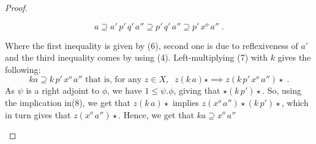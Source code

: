 \documentclass[a4paper]{article}
\theoremstyle{definition}
\begin{document}
\begin{proof}
\begin{enumerate}[label=(\roman*)]
					\begin{equation}
						a\supseteq a'\,p'\,q'\,a'' \supseteq p'\,q'\,a''
						\supseteq p' \,x^o \,a'' \; .
					\end{equation}

					Where the first inequality is given by (6), second one
					is due to reflexiveness	of $a'$ and the third inequality comes by using (4).
					Left-multiplying (7) with $k$ gives the following:
					\begin{equation}
						ka \supseteq k\,p'\,x^o\,a'' \text{ that is, for any } z\in X,
						\; \; z (k\, a) \star \implies z ( k\,p'\,x^o\,a'') \star \; .
					\end{equation}
					As $\psi$ is a right adjoint to $\phi$, we have $1\leq \psi.\phi$, giving that
					$\star (k \, p' )\star $. So, using the implication in(8), we get that
					$z(k\, a) \star $ implies $z ( x^o\,a'') \star (k\,p') \star$, which in turn
					gives that $z(x^o \, a'')\star$. Hence, we get that $ka \supseteq x^o\, a''$
					\qedhere
			\end{enumerate}
		\end{proof}
\newpage
\nocite{Leinster_2014}
		\printbibliography
		
\end{document}
